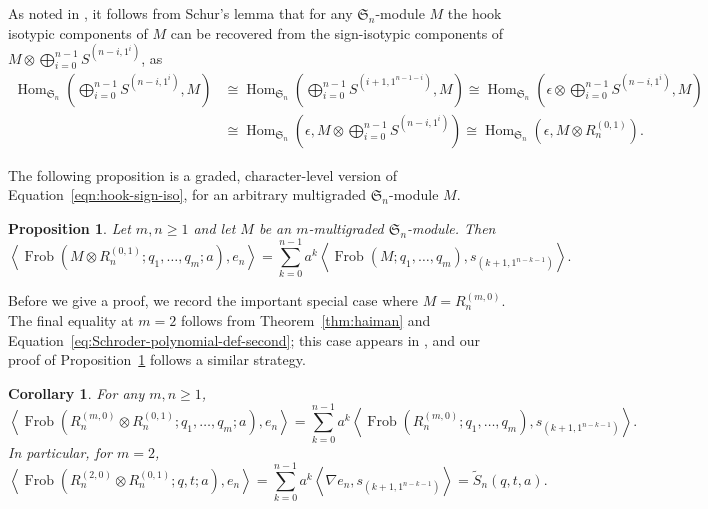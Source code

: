 \documentclass[11pt, noadjust, reqno]{amsart}
\newtheorem{proposition}[theorem]{Proposition}
\newtheorem{corollary}[theorem]{Corollary}
\theoremstyle{definition}
\theoremstyle{remark}
\numberwithin{equation}{section}
\newcommand{\0}{\emptyset}
\renewcommand{\S}{\mathfrak{S}}
\DeclareMathOperator{\Frob}{Frob}
\DeclareMathOperator{\Hom}{Hom}
\begin{document}
As noted in \cite[Section 3.3]{GorskyMellit}, it follows from Schur's lemma that for any $\mathfrak{S}_n$-module $M$ the hook isotypic components of $M$ can 
be recovered from the sign-isotypic components of $M \otimes \bigoplus_{i=0}^{n-1} S^{(n-i,1^i)}$, as
\begin{equation}
\begin{aligned} \label{eqn:hook-sign-iso}
\Hom_{\S_n}\left(\bigoplus_{i=0}^{n-1} S^{(n-i,1^i)},M\right) 
&\cong
\Hom_{\S_n}\left( \bigoplus_{i=0}^{n-1}S^{(i+1,1^{n-1-i})},M\right) 
\cong
\Hom_{\S_n}\left( \epsilon \otimes \bigoplus_{i=0}^{n-1}S^{(n-i,1^i)},M\right) \\
&\cong\Hom_{\S_n}\left( \epsilon, M \otimes \bigoplus_{i=0}^{n-1} S^{(n-i,1^i)}\right)
\cong \Hom_{\S_n}\left( \epsilon, M \otimes R_n^{(0,1)}\right).
\end{aligned}
 \end{equation}

The following proposition is a graded, character-level version of Equation~\eqref{eqn:hook-sign-iso}, for an arbitrary multigraded $\mathfrak{S}_n$-module $M$.

\begin{proposition}\label{prop:HS-generalization}
Let $m,n \geq 1$ and let $M$ be an $m$-multigraded $\mathfrak{S}_n$-module. Then
\begin{equation*} 
\left\langle \Frob(M \otimes R_n^{(0,1)}; q_1,\ldots, q_m;a), e_n\right\rangle = \sum_{k=0}^{n-1} a^k\left\langle \Frob(M; q_1,\ldots, q_m), s_{(k+1,1^{n-k-1})} \right\rangle.
\end{equation*}
\end{proposition}
Before we give a proof, we record the important special case where $M = R_n^{(m,0)}$. 
The final equality at $m=2$ follows from Theorem~\ref{thm:haiman} and Equation~\eqref{eq:Schroder-polynomial-def-second}; this case appears in \cite[proof of Theorem 4.11]{HaglundSergel}, and our proof of Proposition~\ref{prop:HS-generalization} follows a similar strategy. 

\begin{corollary}\label{cor:(2,0)(0,1)bound} For any $m,n \geq 1$,
\begin{equation*} 
\left\langle \Frob(R_n^{(m,0)} \otimes R_n^{(0,1)}; q_1,\ldots,q_m;a), e_n\right\rangle = \sum_{k=0}^{n-1} a^k\left\langle \Frob(R_n^{(m,0)}; q_1,\ldots,q_m), s_{(k+1,1^{n-k-1})} \right\rangle.
\end{equation*}
In particular, for $m=2$,
\begin{equation*} 
\left\langle \Frob(R_n^{(2,0)} \otimes R_n^{(0,1)}; q,t;a), e_n\right\rangle = \sum_{k=0}^{n-1} a^k\left\langle \nabla e_n, s_{(k+1,1^{n-k-1})} \right\rangle = \widetilde{S}_n(q,t,a).
\end{equation*}
\end{corollary}
\end{document}
